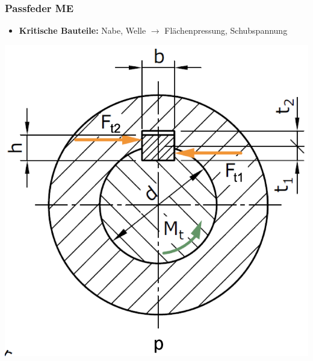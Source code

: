 \subsubsection{Passfeder \hfill ME}
\begin{scriptsize}
   \begin{itemize}
       \item \textbf{Kritische Bauteile:} Nabe, Welle $\to$ Flächenpressung, Schubspannung
   \end{itemize}
\end{scriptsize}
   \begin{minipage}{0.48\linewidth}
    \begin{center}
        \includegraphics[width = 1.0\linewidth]{MAEIP_Passfeder}
    \end{center}
   \end{minipage}
